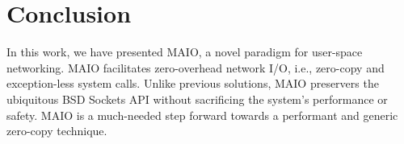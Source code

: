 \documentclass[sigconf,9pt]{acmart}
\newcommand{\oursys}{MAIO\xspace}
\newcommand{\sockets}{BSD Sockets\xspace}
\begin{document}
\maketitle
\sloppypar






\section{Conclusion}
In this work, we have presented \oursys, a novel paradigm for user-space networking. \oursys facilitates zero-overhead network I/O, i.e., zero-copy and exception-less system calls. Unlike previous solutions, \oursys preservers the ubiquitous \sockets API without sacrificing the system's performance or safety.
\oursys is a much-needed step forward towards a performant and generic zero-copy technique. %



\end{document}
